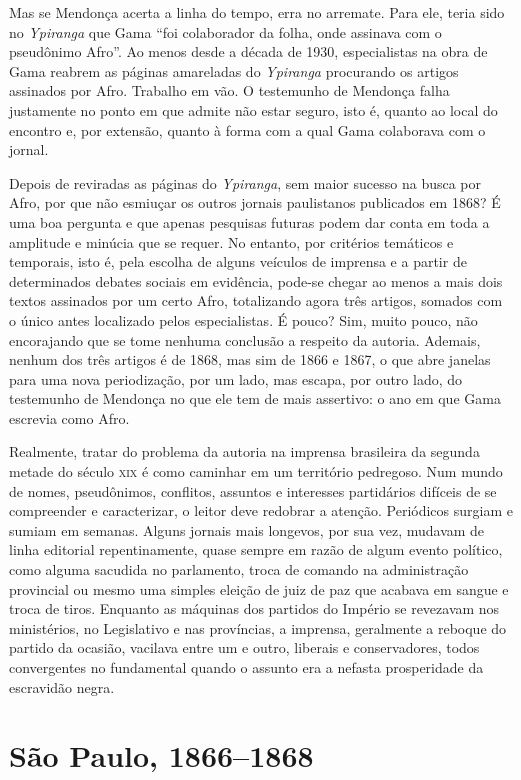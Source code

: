 Mas se Mendonça acerta a linha do tempo, erra no arremate. Para ele,
teria sido no \emph{Ypiranga} que Gama ``foi colaborador da folha, onde
assinava com o pseudônimo Afro''. Ao menos desde a década de 1930,
especialistas na obra de Gama reabrem as páginas amareladas do 
\emph{Ypiranga} procurando os artigos assinados por Afro. Trabalho 
em vão. O testemunho de Mendonça falha justamente no ponto em que admite
não estar seguro, isto é, quanto ao local do encontro e, por extensão,
quanto à forma com a qual Gama colaborava com o jornal.

Depois de reviradas as páginas do \emph{Ypiranga}, sem maior sucesso na
busca por Afro, por que não esmiuçar os outros jornais
paulistanos publicados em 1868? É uma boa pergunta e que apenas
pesquisas futuras podem dar conta em toda a amplitude e minúcia que se
requer. No entanto, por critérios temáticos e temporais, isto é, pela
escolha de alguns veículos de imprensa e a partir de determinados
debates sociais em evidência, pode-se chegar ao menos a mais dois textos
assinados por um certo Afro, totalizando agora três artigos,
somados com o único antes localizado pelos especialistas. É pouco? Sim,
muito pouco, não encorajando que se tome nenhuma conclusão a respeito da
autoria. Ademais, nenhum dos três artigos é de 1868, mas sim de 1866 e
1867, o que abre janelas para uma nova periodização, por um lado, mas
escapa, por outro lado, do testemunho de Mendonça no que ele tem de mais
assertivo: o ano em que Gama escrevia como Afro.

Realmente, tratar do problema da autoria na imprensa brasileira da
segunda metade do século \textsc{xix} é como caminhar em um território pedregoso.
Num mundo de nomes, pseudônimos, conflitos, assuntos e interesses
partidários difíceis de se compreender e caracterizar, o leitor deve
redobrar a atenção. Periódicos surgiam e sumiam em semanas. Alguns
jornais mais longevos, por sua vez, mudavam de linha editorial
repentinamente, quase sempre em razão de algum evento político, como
alguma sacudida no parlamento, troca de comando na administração
provincial ou mesmo uma simples eleição de juiz de paz que acabava em
sangue e troca de tiros. Enquanto as máquinas dos partidos do Império se
revezavam nos ministérios, no Legislativo e nas províncias, a imprensa,
geralmente a reboque do partido da ocasião, vacilava entre um e outro,
liberais e conservadores, todos convergentes no fundamental quando o
assunto era a nefasta prosperidade da escravidão negra.

\section{São Paulo, 1866--1868}

